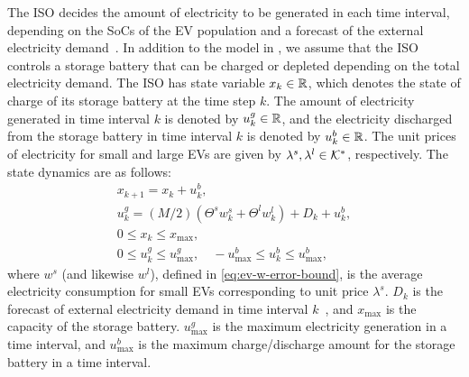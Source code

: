 The ISO decides the amount of electricity to be generated in each time interval, depending on the SoCs of the EV population and a forecast of the external electricity demand~\cite{zou2017efficient}.
In addition to the model in \cite{zou2017efficient}, we assume that the ISO controls a storage battery that can be charged or depleted depending on the total electricity demand.
The ISO has state variable $x_k \in \mathbb{R}$, which denotes the state of charge of its storage battery at the time step $k$.
The amount of electricity generated in time interval $k$ is denoted by $u^g_k \in \mathbb{R}$, and the electricity discharged from the storage battery in time interval $k$ is denoted by $u^b_k \in \mathbb{R}$.
The unit prices of electricity for small and large EVs are given by $\lambda^s, \lambda^l \in \mathcal{K}^*$, respectively.
The state dynamics are as follows:
\begin{equation}
\label{eq:ev-bimpc-dynamics}
\begin{gathered}
    x_{k+1} = x_k + u^b_k, \\
    u^g_k = (M/2) (\Theta^s w^s_k + \Theta^l w^l_k) + D_k + u^b_k, \\
    0 \leq x_k \leq x_\text{max}, \\
    0 \leq u^g_k \leq u^g_\text{max}, \quad -u^b_\text{max} \leq u^b_k \leq u^b_\text{max},
\end{gathered}
\end{equation}
where $w^s$ (and likewise $w^l$), defined in \eqref{eq:ev-w-error-bound}, is the average electricity consumption for small EVs corresponding to unit price $\lambda^s$.
$D_k$ is the forecast of external electricity demand in time interval $k$~\cite{zou2017efficient}, and $x_\text{max}$ is the capacity of the storage battery.
$u^g_\text{max}$ is the maximum electricity generation in a time interval, and $u^b_\text{max}$ is the maximum charge/discharge amount for the storage battery in a time interval.

